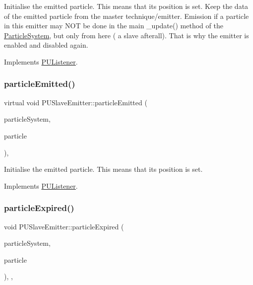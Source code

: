 Initialise the emitted particle. This means that its position is set. Keep the data of the emitted particle from the master technique/emitter. Emission if a particle in this emitter may N\+OT be done in the main \+\_\+update() method of the \hyperlink{classParticleSystem}{Particle\+System}, but only from here ( a slave afterall). That is why the emitter is enabled and disabled again.

Implements \hyperlink{classPUListener}{P\+U\+Listener}.

\mbox{\label{classPUSlaveEmitter_a154976f88d5195573c17d41af8d8cd71}} 
\subsubsection{\texorpdfstring{particle\+Emitted()}{particleEmitted()}\hspace{0.1cm}{\footnotesize\ttfamily [2/2]}}
{\footnotesize\ttfamily virtual void P\+U\+Slave\+Emitter\+::particle\+Emitted (\begin{DoxyParamCaption}\item[{\hyperlink{classPUParticleSystem3D}{P\+U\+Particle\+System3D} $\ast$}]{particle\+System,  }\item[{\hyperlink{structPUParticle3D}{P\+U\+Particle3D} $\ast$}]{particle }\end{DoxyParamCaption})\hspace{0.3cm}{\ttfamily [override]}, {\ttfamily [virtual]}}

Initialise the emitted particle. This means that its position is set. 

Implements \hyperlink{classPUListener}{P\+U\+Listener}.

\mbox{\label{classPUSlaveEmitter_afde1c15d1638e0ab37c93c4337e210a5}} 
\subsubsection{\texorpdfstring{particle\+Expired()}{particleExpired()}\hspace{0.1cm}{\footnotesize\ttfamily [1/2]}}
{\footnotesize\ttfamily void P\+U\+Slave\+Emitter\+::particle\+Expired (\begin{DoxyParamCaption}\item[{\hyperlink{classPUParticleSystem3D}{P\+U\+Particle\+System3D} $\ast$}]{particle\+System,  }\item[{\hyperlink{structPUParticle3D}{P\+U\+Particle3D} $\ast$}]{particle }\end{DoxyParamCaption})\hspace{0.3cm}{\ttfamily [inline]}, {\ttfamily [override]}, {\ttfamily [virtual]}}

